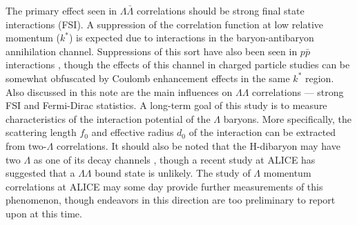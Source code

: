 The primary effect seen in $\Lambda\bar{\Lambda}$ correlations should be strong final state interactions (FSI).  
A suppression of the correlation function at low relative momentum ($k^*$) is expected due to interactions in the baryon-antibaryon annihilation channel.  
Suppressions of this sort have also been seen in $p \bar{p}$ interactions \cite{Gos:2007cj}, though the effects of this channel in charged particle studies can be somewhat obfuscated by Coulomb enhancement effects in the same $k^*$ region.  
Also discussed in this note are the main influences on $\Lambda\Lambda$ correlations --- strong FSI and Fermi-Dirac statistics.  
A long-term goal of this study is to measure characteristics of the interaction potential of the $\Lambda$ baryons.  
More specifically, the scattering length $f_0$ and effective radius $d_0$ of the interaction can be extracted from two-$\Lambda$ correlations. 
It should also be noted that the H-dibaryon may have two $\Lambda$ as one of its decay channels \cite{PhysRevLett.38.195}, though a recent study at ALICE has suggested that a $\Lambda\Lambda$ bound state is unlikely.  
The study of $\Lambda$ momentum correlations at ALICE may some day provide further measurements of this phenomenon, though endeavors in this direction are too preliminary to report upon at this time.